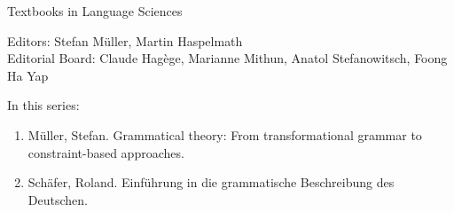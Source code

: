 {\large Textbooks in Language Sciences}

\bigskip

Editors: Stefan Müller, Martin Haspelmath  \\
Editorial Board: Claude Hagège, Marianne Mithun, Anatol Stefanowitsch, Foong Ha Yap

\bigskip

In this series:

\begin{enumerate}
\item Müller, Stefan. Grammatical theory: From transformational grammar to constraint-based approaches.
\item Schäfer, Roland. Einführung in die grammatische Beschreibung des Deutschen.
\end{enumerate}



